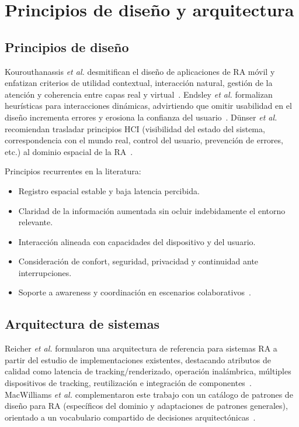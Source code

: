 \documentclass[conference]{IEEEtran}
\begin{document}
\section{Principios de dise\~no y arquitectura}

\subsection{Principios de dise\~no}
Kourouthanassis \textit{et al.} desmitifican el dise\~no de aplicaciones de RA m\'ovil y enfatizan criterios de utilidad contextual, interacci\'on natural, gesti\'on de la atenci\'on y coherencia entre capas real y virtual~\cite{kourouthanassis2015demystifying}. Endsley \textit{et al.} formalizan heur\'isticas para interacciones din\'amicas, advirtiendo que omitir usabilidad en el dise\~no incrementa errores y erosiona la confianza del usuario~\cite{endsley2017heuristics}. D\"unser \textit{et al.} recomiendan trasladar principios HCI (visibilidad del estado del sistema, correspondencia con el mundo real, control del usuario, prevenci\'on de errores, etc.) al dominio espacial de la RA~\cite{dunser2007hci}.

Principios recurrentes en la literatura:
\begin{itemize}
\item Registro espacial estable y baja latencia percibida.
\item Claridad de la informaci\'on aumentada sin ocluir indebidamente el entorno relevante.
\item Interacci\'on alineada con capacidades del dispositivo y del usuario.
\item Consideraci\'on de confort, seguridad, privacidad y continuidad ante interrupciones.
\item Soporte a awareness y coordinaci\'on en escenarios colaborativos~\cite{sereno2022collaborative}.
\end{itemize}

\subsection{Arquitectura de sistemas}
Reicher \textit{et al.} formularon una arquitectura de referencia para sistemas RA a partir del estudio de implementaciones existentes, destacando atributos de calidad como latencia de tracking/renderizado, operaci\'on inal\'ambrica, m\'ultiples dispositivos de tracking, reutilizaci\'on e integraci\'on de componentes~\cite{reicher2003architecture}. MacWilliams \textit{et al.} complementaron este trabajo con un cat\'alogo de patrones de dise\~no para RA (espec\'ificos del dominio y adaptaciones de patrones generales), orientado a un vocabulario compartido de decisiones arquitect\'onicas~\cite{macwilliams2004patterns}.
\end{document}
